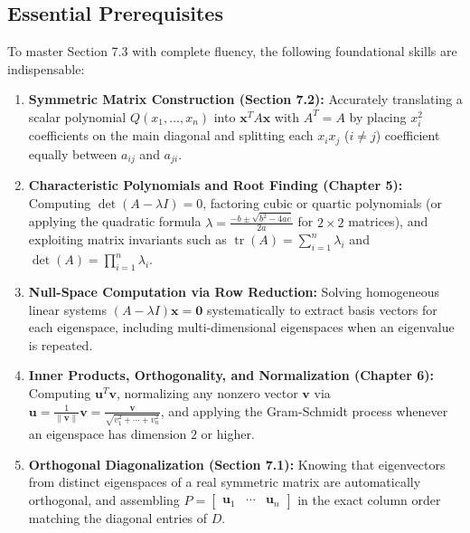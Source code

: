 \documentclass[11pt, letterpaper]{article}
\theoremstyle{definition}
\theoremstyle{remark}
\begin{document}
\subsection{Essential Prerequisites}

To master Section 7.3 with complete fluency, the following foundational skills are indispensable:
\begin{enumerate}[leftmargin=2em]
    \item \textbf{Symmetric Matrix Construction (Section 7.2):} Accurately translating a scalar polynomial $Q(x_1, \dots, x_n)$ into $\mathbf{x}^T A \mathbf{x}$ with $A^T = A$ by placing $x_i^2$ coefficients on the main diagonal and splitting each $x_i x_j$ ($i \neq j$) coefficient equally between $a_{ij}$ and $a_{ji}$.
    \item \textbf{Characteristic Polynomials and Root Finding (Chapter 5):} Computing $\det(A - \lambda I) = 0$, factoring cubic or quartic polynomials (or applying the quadratic formula $\lambda = \frac{-b \pm \sqrt{b^2 - 4ac}}{2a}$ for $2 \times 2$ matrices), and exploiting matrix invariants such as $\operatorname{tr}(A) = \sum_{i=1}^n \lambda_i$ and $\det(A) = \prod_{i=1}^n \lambda_i$.
    \item \textbf{Null-Space Computation via Row Reduction:} Solving homogeneous linear systems $(A - \lambda I)\mathbf{x} = \mathbf{0}$ systematically to extract basis vectors for each eigenspace, including multi-dimensional eigenspaces when an eigenvalue is repeated.
    \item \textbf{Inner Products, Orthogonality, and Normalization (Chapter 6):} Computing $\mathbf{u}^T \mathbf{v}$, normalizing any nonzero vector $\mathbf{v}$ via $\mathbf{u} = \frac{1}{\|\mathbf{v}\|}\mathbf{v} = \frac{\mathbf{v}}{\sqrt{v_1^2 + \cdots + v_n^2}}$, and applying the Gram-Schmidt process whenever an eigenspace has dimension $2$ or higher.
    \item \textbf{Orthogonal Diagonalization (Section 7.1):} Knowing that eigenvectors from distinct eigenspaces of a real symmetric matrix are automatically orthogonal, and assembling $P = \begin{bmatrix} \mathbf{u}_1 & \cdots & \mathbf{u}_n \end{bmatrix}$ in the exact column order matching the diagonal entries of $D$.
\end{enumerate}

\newpage

\end{document}
